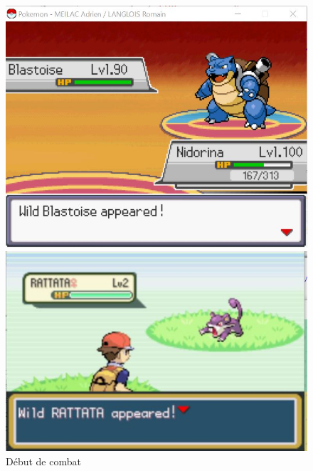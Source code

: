 \documentclass[a4paper,twoside, openany,11pt]{book}
\begin{document}
\begin{figure}
\begin{minipage}{0.49\textwidth}
\includegraphics[scale = 0.6]{Graphiques/combat_start.jpg}
\end{minipage}
\begin{minipage}{0.49\textwidth}
\includegraphics[scale = 0.84]{Graphiques/vrai_jeu_combat_start.jpg}
\end{minipage}
\caption{Début de combat}
\end{figure}
\end{document}
